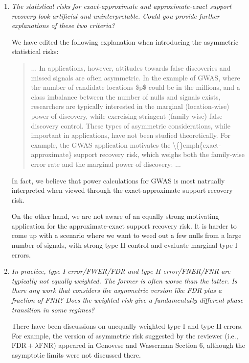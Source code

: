 \documentclass[11pt]{article}
\begin{document}
\begin{enumerate}
    \item {\em The statistical risks for exact-approximate and approximate-exact support recovery look artificial and uninterpretable. 
    Could you provide further explanations of these two criteria?} 
    
    We have edited the following explanation when introducing the asymmetric statistical risks:
    \begin{quote}
    $\dots$
	In applications, however, attitudes towards false discoveries and missed signals are often asymmetric.
	In the example of GWAS, where the number of candidate locations \$p\$ could be in the millions, and a class imbalance between the number of nulls and signals exists, researchers are typically interested in the marginal (location-wise) power of discovery, while exercising stringent (family-wise) false discovery control. 
	These types of asymmetric considerations, while important in applications, have not been studied theoretically.  
	For example, the GWAS application motivates the \textbackslash\{\}emph\{exact-approximate\} support recovery risk, which weighs both the family-wise error rate and the marginal power of discovery:
	$\dots$
    \end{quote}
    In fact, we believe that power calculations for GWAS is most natrually interpreted when viewed through the exact-approximate support recovery risk.
    
    On the other hand, we are not aware of an equally strong motivating application for the approximate-exact support recovery risk. 
    It is harder to come up with a scenario where we want to weed out a few nulls from a large number of signals, with strong type II control and evaluate marginal type I errors. 
        
    \item {\em In practice, type-I error/FWER/FDR and type-II error/FNER/FNR are typically not equally weighted. The former is often worse than the latter. Is there any work that considers the asymmetric version like FDR plus a fraction of FNR? Does the weighted risk give a fundamentally different phase transition in some regimes?}
    
    There have been discussions on unequally weighted type I and type II errors. For example, the version of asymmetric risk suggested by the reviewer (i.e., $\textrm{FDR} + \lambda\textrm{FNR}$) appeared in Genovese and Wasserman \citep{genovese2002operating} Section 6, although the asymptotic limits were not discussed there.
    

\end{enumerate}
\end{document}
